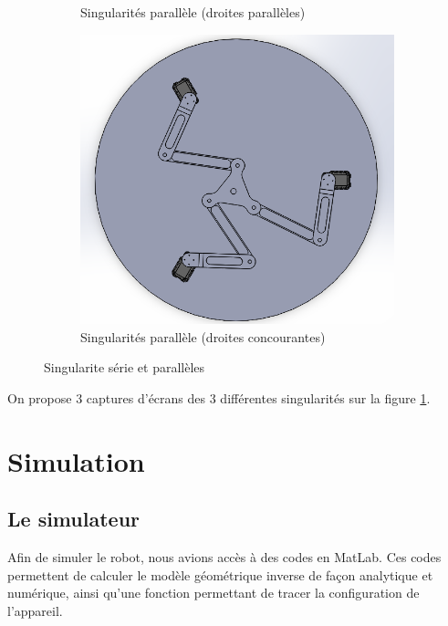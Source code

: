 \documentclass[a4paper, 11pt]{report}
\begin{document}
\begin{figure}[!tbh]
\begin{subfigure}[t]{0.48\textwidth}
        \caption{Singularités parallèle (droites parallèles)}
    \end{subfigure}
    \begin{subfigure}[t]{0.48\textwidth}
        \centering
        \includegraphics[width=\textwidth]{Figures/singularite parallele concourante.png}
        \caption{Singularités parallèle (droites concourantes)}
    \end{subfigure}
    \caption{Singularite série et parallèles}
    \label{fig:singularity}
\end{figure}

On propose 3 captures d'écrans des 3 différentes singularités sur la figure \ref{fig:singularity}.

\section{Simulation}
\subsection{Le simulateur}
Afin de simuler le robot, nous avions accès à des codes en MatLab. Ces codes permettent de calculer le modèle géométrique inverse de façon analytique et numérique, ainsi qu'une fonction permettant de tracer la configuration de l'appareil.
\end{document}
